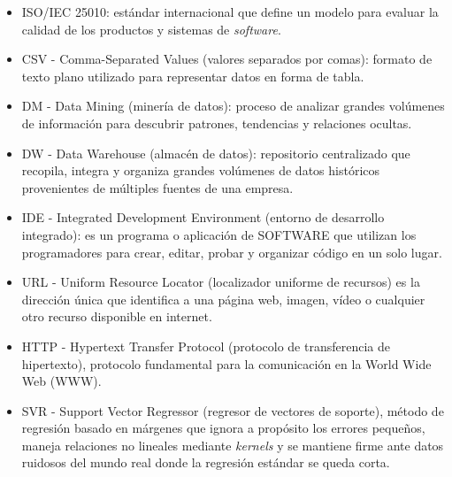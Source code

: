 \begin{itemize}
    \item ISO/IEC 25010: estándar internacional que define un modelo para evaluar la calidad de los productos y sistemas de \textit{software}.
    \item CSV - Comma-Separated Values (valores separados por comas): formato de texto plano utilizado para representar datos en forma de tabla.
    \item DM - Data Mining (minería de datos): proceso de analizar grandes volúmenes de información para descubrir patrones, tendencias y relaciones ocultas.
    \item DW - Data Warehouse (almacén de datos): repositorio centralizado que recopila, integra y organiza grandes volúmenes de datos históricos provenientes de múltiples fuentes de una empresa.
    \item IDE - Integrated Development Environment (entorno de desarrollo integrado): es un programa o aplicación de SOFTWARE que utilizan los programadores para crear, editar, probar y organizar código en un solo lugar. 
    \item URL - Uniform Resource Locator (localizador uniforme de recursos) es la dirección única que identifica a una página web, imagen, vídeo o cualquier otro recurso disponible en internet.
    \item HTTP - Hypertext Transfer Protocol (protocolo de transferencia de hipertexto), protocolo fundamental para la comunicación en la World Wide Web (WWW).
    \item SVR - Support Vector Regressor (regresor de vectores de soporte), método de regresión basado en márgenes que ignora a propósito los errores pequeños, maneja relaciones no lineales mediante \textit{kernels} y se mantiene firme ante datos ruidosos del mundo real donde la regresión estándar se queda corta.
\end{itemize}

